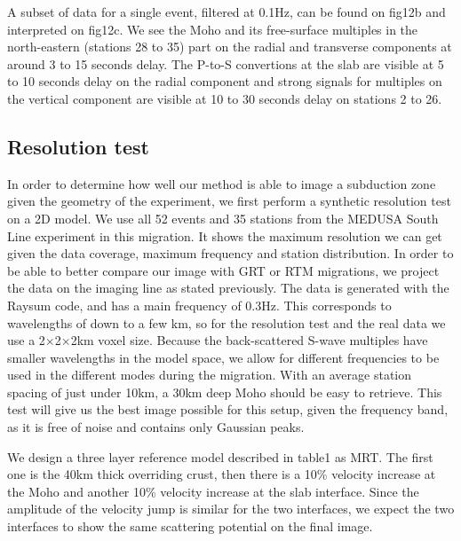 \documentclass[10pt,a4paper]{article}
\numberwithin{equation}{section}
\DeclareRobustCommand{\rq}[1]{{\sethlcolor{myblue}\hl{#1}}}
\begin{document}
A subset of data for a single event, filtered at 0.1Hz, can be found on fig12b and interpreted on fig12c.
We see the Moho and its free-surface multiples in the north-eastern (stations 28 to 35) part on the radial and transverse components at around 3 to 15 seconds delay.
The P-to-S convertions at the slab are visible at 5 to 10 seconds delay on the radial component and strong signals for multiples on the vertical component are visible at 10 to 30 seconds delay on stations 2 to 26.

\subsection{Resolution test}

In order to determine how well our method is able to image a subduction zone given the geometry of the experiment, we first perform a synthetic resolution test on a 2D model.
We use all 52 events and 35 stations from the MEDUSA South Line experiment in this migration.
It shows the maximum resolution we can get given the data coverage, maximum frequency and station distribution.
In order to be able to better compare our image with GRT or RTM migrations, we project the data on the imaging line as stated previously.
The data is generated with the Raysum code, and has a main frequency of 0.3Hz.
This corresponds to wavelengths of down to a few km, so for the resolution test and the real data we use a 2$\times$2$\times$2km voxel size.
Because the back-scattered S-wave multiples have smaller wavelengths in the model space, we allow for different frequencies to be used in the different modes during the migration.
With an average station spacing of just under 10km, a 30km deep Moho should be easy to retrieve.
This test will give us the best image possible for this setup, given the frequency band, as it is free of noise and contains only Gaussian peaks. 

We design a three layer reference model described in table1 as MRT.
The first one is the 40km thick overriding crust, then there is a 10\% velocity increase at the Moho and another 10\% velocity increase at the slab interface.
Since the amplitude of the velocity jump is similar for the two interfaces, we expect the two interfaces to show the same scattering potential on the final image.
\end{document}
